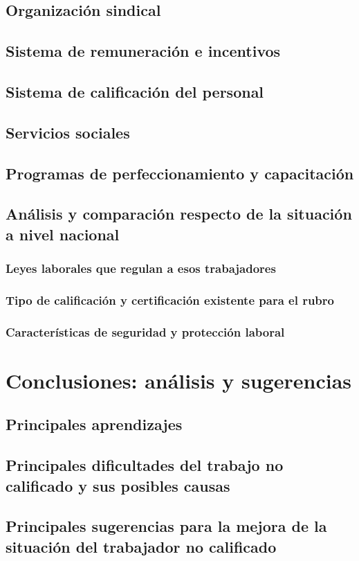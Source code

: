 \subsection{Organización sindical}
\subsection{Sistema de remuneración e incentivos}
\subsection{Sistema de calificación del personal}
\subsection{Servicios sociales}
\subsection{Programas de perfeccionamiento y capacitación}
\subsection{Análisis y comparación respecto de la situación a nivel nacional}
\subsubsection{Leyes laborales que regulan a esos trabajadores}
\subsubsection{Tipo de calificación y certificación existente para el rubro}
\subsubsection{Características de seguridad y protección laboral}

\section{Conclusiones: análisis y sugerencias}
\subsection{Principales aprendizajes}
\subsection{Principales dificultades del trabajo no calificado y sus posibles causas}
\subsection{Principales sugerencias para la mejora de la situación del trabajador no calificado}